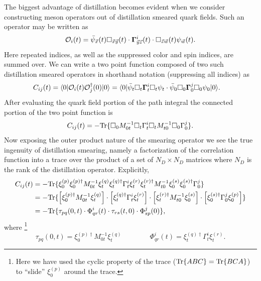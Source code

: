 The biggest advantage of distillation becomes evident when we consider constructing meson operators out of distillation smeared quark fields. Such an operator may be written as 
\begin{equation*}
\mathcal{O}_i(t) =  \bar{\psi}_{\vec{x}}(t)  \Box_{\vec{x}\vec{y}}(t)  \cdot  \mathbf{\Gamma}^i_{\vec{y} \vec{z}}(t)  \cdot   \Box_{\vec{z}\vec{w}}(t) \psi_{\vec{w}}(t).
\end{equation*}
Here repeated indices, as well as the suppressed color and spin indices, are summed over.  We can write a two point function composed of two such distillation smeared operators in shorthand notation (suppressing all indices) as
\begin{align*}
C_{ij}(t) = \langle 0 | \mathcal{O}_i(t) \mathcal{O}_j^\dagger(0) | 0 \rangle &= \langle 0 |\bar{\psi}_t \Box_t\mathbf{\Gamma}_t^i \Box_t \psi_t  \cdot \bar{\psi}_0 \Box_0\mathbf{\Gamma}_0^j \Box_0\psi_0  | 0 \rangle. 
\end{align*}
 After evaluating the quark field portion of the path integral the connected portion of the two point function is 
\begin{align*}
 C_{ij}(t) = -\mathrm{Tr}\{\Box_0 M^{-1}_{0t} \Box_t \Gamma^i_t \Box_t M^{-1}_{t0} \Box_0 \Gamma^j_0\}.
\end{align*}
Now exposing the outer product nature of the smearing operator we see the true ingenuity of distillation smearing, namely a factorization of the correlation function into a trace over the product of a set of $N_D\times N_D$ matrices where $N_D$ is the rank of the distillation operator. Explicitly,
\begin{align*}
 C_{ij}(t) &= - \mathrm{Tr}\{\xi^{(p)}_0 \xi^{(p)\dagger}_0 M^{-1}_{0t} \xi^{(q)}_t \xi^{(q)\dagger}_t \Gamma^i_t \xi^{(r)}_t \xi^{(r)\dagger}_t  M^{-1}_{t0} \xi^{(s)}_0 \xi^{(s)\dagger}_0 \Gamma^j_0\} \\
 &= -\mathrm{Tr}\{  \left[ \xi^{(p)\dagger}_0 M^{-1}_{0t} \xi^{(q)}_t  \right] \cdot \left[  \xi^{(q)\dagger}_t \Gamma^i_t \xi^{(r)}_t  \right] \cdot \left[ \xi^{(r)\dagger}_t  M^{-1}_{t0} \xi^{(s)}_0 \right] \cdot \left[ \xi^{(s)\dagger}_0 \Gamma^j_0 \xi^{(p)}_0\right] \} \\
 &= - \mathrm{Tr}\{ \tau_{pq}(0,t) \cdot \Phi^i_{qr}(t) \cdot \tau_{rs}(t,0)\cdot \Phi^j_{sp}(0)\},
\end{align*}
where \footnote{Here we have used the cyclic property of the trace ($\mathrm{Tr}\{ABC\} = \mathrm{Tr}\{BCA\}$) to ``slide'' $\xi^{(p)}_0$ around the trace.}
\begin{equation*}
\tau_{pq}(0,t) = \xi^{(p)\dagger}_0 M^{-1}_{0t} \xi^{(q)}_t \qquad \qquad \Phi^i_{qr}(t) =   \xi^{(q)\dagger}_t \Gamma^i_t \xi^{(r)}_t.
\end{equation*}

